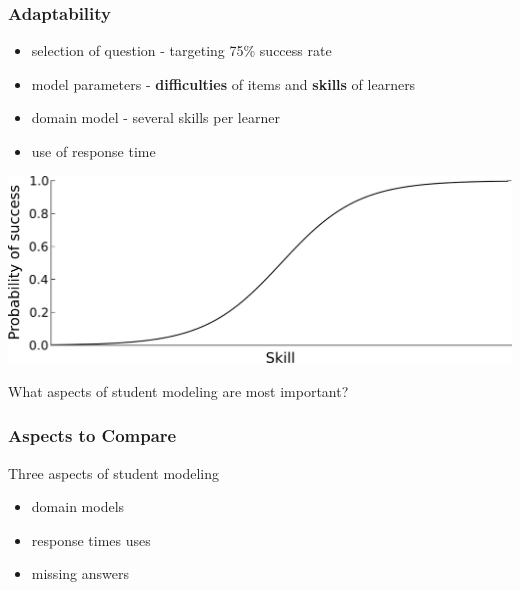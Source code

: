 \documentclass[xcolor=svgnames]{beamer}
\begin{document}
\begin{frame}
    \frametitle{Adaptability}
    \begin{itemize}
        \item selection of question - targeting 75\% success rate
        \item model parameters - \textbf{difficulties} of items and \textbf{skills} of learners
        \item domain model - several skills per learner
        \item use of response time
    \end{itemize}

    \vfill

    \centering
    \includegraphics[width=0.6\linewidth]{figures/logistic}
\end{frame}
\begin{frame}
    \centering

    \huge
    What aspects of student modeling are most important?

\end{frame}
\begin{frame}
    \frametitle{Aspects to Compare}

    Three aspects of student modeling
    \begin{itemize}
        \item domain models
        \item response times uses
        \item missing answers
    \end{itemize}

\end{frame}
\end{document}
